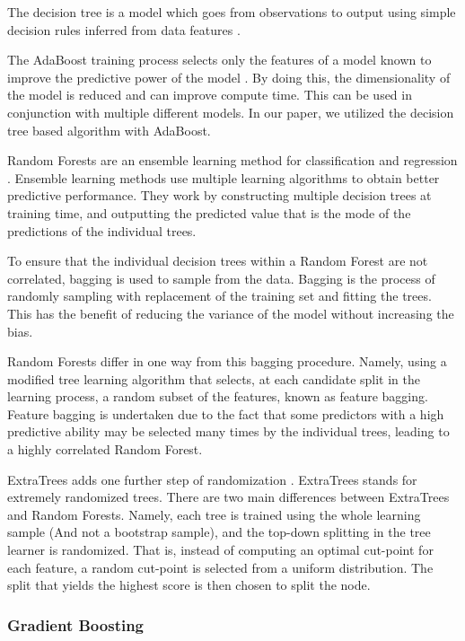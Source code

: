 \documentclass[final,3p,times,twocolumn,numbers]{elsarticle}
\begin{document}
The decision tree is a model which goes from observations to output using simple decision rules inferred from data features \cite{Quinlan}.

The AdaBoost training process selects only the features of a model known to improve the predictive power of the model \cite{Freund1997}. By doing this, the dimensionality of the model is reduced and can improve compute time. This can be used in conjunction with multiple different models. In our paper, we utilized the decision tree based algorithm with AdaBoost.

Random Forests are an ensemble learning method for classification and regression \cite{Breiman2001}. Ensemble learning methods use multiple learning algorithms to obtain better predictive performance. They work by constructing multiple decision trees at training time, and outputting the predicted value that is the mode of the predictions of the individual trees.

To ensure that the individual decision trees within a Random Forest are not correlated, bagging is used to sample from the data. Bagging is the process of randomly sampling with replacement of the training set and fitting the trees. This has the benefit of reducing the variance of the model without increasing the bias. 

Random Forests differ in one way from this bagging procedure. Namely, using a modified tree learning algorithm that selects, at each candidate split in the learning process, a random subset of the features, known as feature bagging. Feature bagging is undertaken due to the fact that some predictors with a high predictive ability may be selected many times by the individual trees, leading to a highly correlated Random Forest.

ExtraTrees adds one further step of randomization \cite{Fike1988}. ExtraTrees stands for extremely randomized trees. There are two main differences between ExtraTrees and Random Forests. Namely, each tree is trained using the whole learning sample (And not a bootstrap sample), and the top-down splitting in the tree learner is randomized. That is, instead of computing an optimal cut-point for each feature, a random cut-point is selected from a uniform distribution. The split that yields the highest score is then chosen to split the node. 


\subsubsection{Gradient Boosting}
\end{document}
